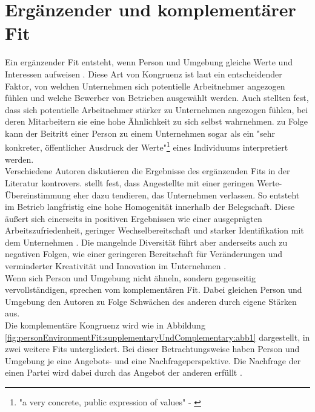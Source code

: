 \section{Ergänzender und komplementärer Fit}
\label{ch:personEnvironmentFit:supplementaryUndComplementary}
Ein ergänzender Fit entsteht, wenn Person und Umgebung gleiche Werte und Interessen aufweisen \cite[S. 2f.]{muchinsky:1987}. Diese Art von Kongruenz ist laut \textcite[S. 1ff.]{schneider:1987} ein entscheidender Faktor, von welchen Unternehmen sich potentielle Arbeitnehmer angezogen fühlen und welche Bewerber von Betrieben ausgewählt werden. Auch \textcite[S. 7]{devendorf:2008} stellten fest, dass sich potentielle Arbeitnehmer stärker zu Unternehmen angezogen fühlen, bei deren Mitarbeitern sie eine hohe Ähnlichkeit zu sich selbst wahrnehmen. \textcite[S. 4]{popovich:1982} zu Folge kann der Beitritt einer Person zu einem Unternehmen sogar als ein "sehr konkreter, öffentlicher Ausdruck der Werte"\footnote{"a very concrete, public expression of values" - \textcite[S. 4]{popovich:1982}} eines Individuums interpretiert werden.\\
Verschiedene Autoren diskutieren die Ergebnisse des ergänzenden Fits in der Literatur kontrovers. \textcite[S. 6]{schneider:1987} stellt fest, dass Angestellte mit einer geringen Werte-Übereinstimmung eher dazu tendieren, das Unternehmen verlassen. So entsteht im Betrieb langfristig eine hohe Homogenität innerhalb der Belegschaft. Diese äußert sich einerseits in positiven Ergebnissen wie einer ausgeprägten Arbeitszufriedenheit, geringer Wechselbereitschaft und starker Identifikation mit dem Unternehmen \cite[S. 25ff.]{kristof:1996}\cite[S. 5]{su:2015}. Die mangelnde Diversität führt aber anderseits auch zu negativen Folgen, wie einer geringeren Bereitschaft für Veränderungen \cite[S. 10]{schneider:1987} und verminderter Kreativität und Innovation im Unternehmen \cite[S. 7]{chatman:1998}.\\
Wenn sich Person und Umgebung nicht ähneln, sondern gegenseitig vervollständigen, sprechen \textcite[S. 4]{muchinsky:1987} vom komplementären Fit. Dabei gleichen Person und Umgebung den Autoren zu Folge Schwächen des anderen durch eigene Stärken aus.\\
Die komplementäre Kongruenz wird wie in Abbildung \ref{fig:personEnvironmentFit:supplementaryUndComplementary:abb1} dargestellt, in zwei weitere Fits untergliedert. Bei dieser Betrachtungsweise haben Person und Umgebung je eine Angebots- und eine Nachfrageperspektive. Die Nachfrage der einen Partei wird dabei durch das Angebot der anderen erfüllt \cite[S. 2ff.]{caplan:1987}\cite[S. 2f.]{edwards:1991}.\\
